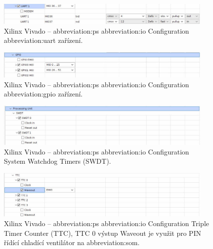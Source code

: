 \documentclass[a4paper, twoside, 11pt]{article}
\begin{document}
				\begin{figure}[htbp!]
					\centering
					\includegraphics[width=0.95\textwidth]{src/png/kr26-xilinx-vivado-flow/kr26-xilix-vivado-flow-21.jpg}
					\caption{Xilinx Vivado – \gls{abbreviation:ps} \gls{abbreviation:io} Configuration \gls{abbreviation:uart} zařízení.}
					\label{fig:kr26-xilix-vivado-flow-21}
				\end{figure}

				\begin{figure}[htbp!]
					\centering
					\includegraphics[width=0.95\textwidth]{src/png/kr26-xilinx-vivado-flow/kr26-xilix-vivado-flow-22.jpg}
					\caption{Xilinx Vivado – \gls{abbreviation:ps} \gls{abbreviation:io} Configuration \gls{abbreviation:gpio} zařízení.}
					\label{fig:kr26-xilix-vivado-flow-22}
				\end{figure}


				\begin{figure}[htbp!]
					\centering
					\includegraphics[width=0.95\textwidth]{src/png/kr26-xilinx-vivado-flow/kr26-xilix-vivado-flow-23.jpg}
					\caption{Xilinx Vivado – \gls{abbreviation:ps} \gls{abbreviation:io} Configuration System Watchdog Timers (SWDT).}
					\label{fig:kr26-xilix-vivado-flow-23}
				\end{figure}

				\begin{figure}[htbp!]
					\centering
					\includegraphics[width=0.95\textwidth]{src/png/kr26-xilinx-vivado-flow/kr26-xilix-vivado-flow-30.jpg}
					\caption{Xilinx Vivado – \gls{abbreviation:ps} \gls{abbreviation:io} Configuration Triple Timer Counter (TTC), TTC 0 výstup Waveout je využit pro PIN řídící chladící ventilátor na \gls{abbreviation:som}.}
					\label{fig:kr26-xilix-vivado-flow-30}
				\end{figure}
\end{document}
